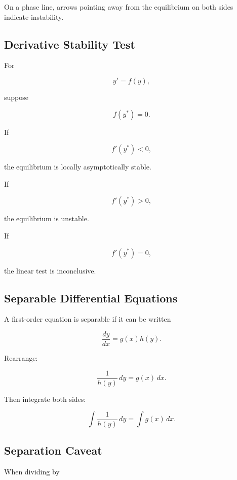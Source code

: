 On a phase line, arrows pointing away from the equilibrium on both sides
indicate instability.

\subsection{Derivative Stability Test}
\label{subsec:one-dimensional-stability-test}

For

\[
y'=f(y),
\]

suppose

\[
f(y^*)=0.
\]

If

\[
\boxed{
f'(y^*)<0,
}
\]

the equilibrium is locally asymptotically stable.

If

\[
\boxed{
f'(y^*)>0,
}
\]

the equilibrium is unstable.

If

\[
f'(y^*)=0,
\]

the linear test is inconclusive.

\subsection{Separable Differential Equations}
\label{subsec:separable-equations}

A first-order equation is separable if it can be written

\[
\boxed{
\frac{dy}{dx}
=
g(x)h(y).
}
\]

Rearrange:

\[
\boxed{
\frac1{h(y)}
\,dy
=
g(x)\,dx.
}
\]

Then integrate both sides:

\[
\boxed{
\int
\frac1{h(y)}
\,dy
=
\int
g(x)\,dx.
}
\]

\subsection{Separation Caveat}
\label{subsec:separation-caveat}

When dividing by

